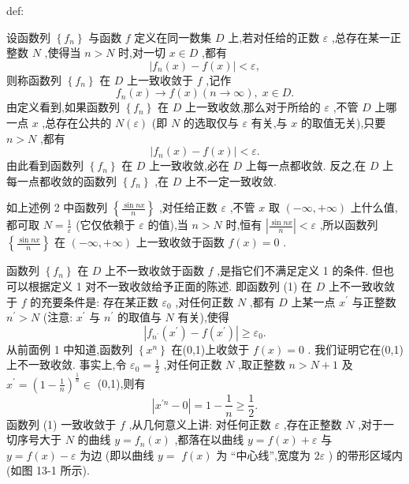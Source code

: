 \begin{definition}{}{def:}

\end{definition}
设函数列 \(\left\{  {f}_{n}\right\}\) 与函数 \(f\) 定义在同一数集 \(D\) 上,若对任给的正数 \(\varepsilon\) ,总存在某一正整数 \(N\) ,使得当 \(n > N\) 时,对一切 \(x \in  D\) ,都有
\[
\left| {{f}_{n}\left( x\right)  - f\left( x\right) }\right|  < \varepsilon ,
\]
则称函数列 \(\left\{  {f}_{n}\right\}\) 在 \(D\) 上一致收敛于 \(f\) ,记作
\[
{f}_{n}\left( x\right)  \rightarrow  f\left( x\right) \left( {n \rightarrow  \infty }\right) ,\;x \in  D.
\]
由定义看到,如果函数列 \(\left\{  {f}_{n}\right\}\) 在 \(D\) 上一致收敛,那么对于所给的 \(\varepsilon\) ,不管 \(D\) 上哪一点 \(x\) ,总存在公共的 \(N\left( \varepsilon \right)\) (即 \(N\) 的选取仅与 \(\varepsilon\) 有关,与 \(x\) 的取值无关),只要 \(n > N\) ,都有
\[
\left| {{f}_{n}\left( x\right)  - f\left( x\right) }\right|  < \varepsilon .
\]
由此看到函数列 \(\left\{  {f}_{n}\right\}\) 在 \(D\) 上一致收敛,必在 \(D\) 上每一点都收敛. 反之,在 \(D\) 上每一点都收敛的函数列 \(\left\{  {f}_{n}\right\}\) ,在 \(D\) 上不一定一致收敛.

如上述例 2 中函数列 \(\left\{  \frac{\sin {nx}}{n}\right\}\) ,对任给正数 \(\varepsilon\) ,不管 \(x\) 取 \(\left( {-\infty , + \infty }\right)\) 上什么值,都可取 \(N = \frac{1}{\varepsilon }\) (它仅依赖于 \(\varepsilon\) 的值),当 \(n > N\) 时,恒有 \(\left| \frac{\sin {nx}}{n}\right|  < \varepsilon\) ,所以函数列 \(\left\{  \frac{\sin {nx}}{n}\right\}\) 在 \(\left( {-\infty , + \infty }\right)\) 上一致收敛于函数 \(f\left( x\right)  = 0\) .

函数列 \(\left\{  {f}_{n}\right\}\) 在 \(D\) 上不一致收敛于函数 \(f\) ,是指它们不满足定义 1 的条件. 但也可以根据定义 1 对不一致收敛给予正面的陈述. 即函数列 (1) 在 \(D\) 上不一致收敛于 \(f\) 的充要条件是: 存在某正数 \({\varepsilon }_{0}\) ,对任何正数 \(N\) ,都有 \(D\) 上某一点 \({x}^{\prime }\) 与正整数 \({n}^{\prime } > N\) (注意: \({x}^{\prime }\) 与 \({n}^{\prime }\) 的取值与 \(N\) 有关),使得
\[
\left| {{f}_{{n}^{\prime }}\left( {x}^{\prime }\right)  - f\left( {x}^{\prime }\right) }\right|  \geq  {\varepsilon }_{0}.
\]
从前面例 1 中知道,函数列 \(\left\{  {x}^{n}\right\}\) 在(0,1)上收敛于 \(f\left( x\right)  = 0\) . 我们证明它在(0,1) 上不一致收敛. 事实上,令 \({\varepsilon }_{0} = \frac{1}{2}\) ,对任何正数 \(N\) ,取正整数 \(n > N + 1\) 及 \({x}^{\prime } = {\left( 1 - \frac{1}{n}\right) }^{\frac{1}{n}} \in\) (0,1),则有
\[
\left| {{x}^{\prime n} - 0}\right|  = 1 - \frac{1}{n} \geq  \frac{1}{2}.
\]
函数列 (1) 一致收敛于 \(f\) ,从几何意义上讲: 对任何正数 \(\varepsilon\) ,存在正整数 \(N\) ,对于一切序号大于 \(N\) 的曲线 \(y = {f}_{n}\left( x\right)\) ,都落在以曲线 \(y = f\left( x\right)  + \varepsilon\) 与 \(y = f\left( x\right)  - \varepsilon\) 为边 (即以曲线 \(y =\)  \(f\left( x\right)\) 为 “中心线”,宽度为 \({2\varepsilon }\) ) 的带形区域内 (如图 13-1 所示).

